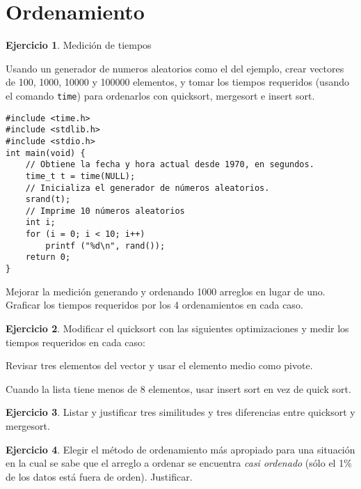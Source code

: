 \documentclass[11pt,a4paper]{article}
\theoremstyle{definition}
\newtheorem{ejercicio}{Ejercicio}[section]
\begin{document}
\section{Ordenamiento}

\begin{ejercicio}
Medición de tiempos
\begin{partes}
\item Usando un generador de numeros aleatorios como el del ejemplo, crear vectores
de 100, 1000, 10000 y 100000 elementos, y tomar los tiempos requeridos (usando
el comando \verb!time!) para ordenarlos con quicksort, mergesort e insert sort.

\begin{lstlisting}
#include <time.h>
#include <stdlib.h>
#include <stdio.h>
int main(void) {
    // Obtiene la fecha y hora actual desde 1970, en segundos.
    time_t t = time(NULL);
    // Inicializa el generador de números aleatorios.
    srand(t);
    // Imprime 10 números aleatorios
    int i;
    for (i = 0; i < 10; i++)
        printf ("%d\n", rand());
    return 0;
}
\end{lstlisting}

\item Mejorar la medición generando y ordenando 1000 arreglos en lugar de uno.
Graficar los tiempos requeridos por los 4 ordenamientos en cada caso.
\end{partes}
\end{ejercicio}

\begin{ejercicio}
Modificar el quicksort con las siguientes optimizaciones y medir los tiempos
requeridos en cada caso:
\begin{partes}
\item Revisar tres elementos del vector y usar el elemento medio como
pivote.
\item Cuando la lista tiene menos de 8 elementos, usar insert sort en vez
de quick sort.
\end{partes}
\end{ejercicio}

\begin{ejercicio}
Listar y justificar tres similitudes y tres diferencias entre quicksort y
mergesort.
\end{ejercicio}

\begin{ejercicio}
Elegir el método de ordenamiento más apropiado para una situación en la
cual se sabe que el arreglo a ordenar se encuentra \textit{casi ordenado}
(sólo el 1\% de los datos está fuera de orden). Justificar.
\end{ejercicio}
\end{document}
